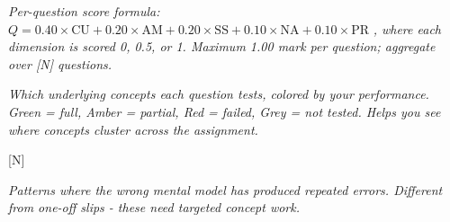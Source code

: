 \documentclass[11pt,a4paper]{article}
\begin{document}

\par\vspace{0.3cm}
{\fontsize{9pt}{12pt}\selectfont\color{tsGrey}\textit{Per-question score formula: }}%
{\fontsize{10pt}{12pt}\selectfont $Q = 0.40 \times \mathrm{CU} + 0.20 \times \mathrm{AM} + 0.20 \times \mathrm{SS} + 0.10 \times \mathrm{NA} + 0.10 \times \mathrm{PR}$}%
{\fontsize{9pt}{12pt}\selectfont\color{tsGrey}\textit{, where each dimension is scored 0, 0.5, or 1. Maximum 1.00 mark per question; aggregate over [N] questions.}}


\par {\fontsize{9pt}{12pt}\selectfont\color{tsGrey}\textit{Which underlying concepts each question tests, colored by your performance. Green = full, Amber = partial, Red = failed, Grey = not tested. Helps you see where concepts cluster across the assignment.}}

\begin{tsConceptMap}{[N]}
\end{tsConceptMap}



\par {\fontsize{9pt}{12pt}\selectfont\color{tsGrey}\textit{Patterns where the wrong mental model has produced repeated errors. Different from one-off slips - these need targeted concept work.}}
\end{document}
